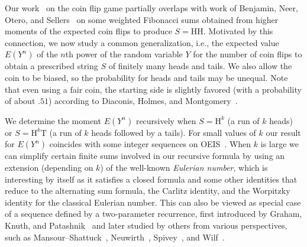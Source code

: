 \documentclass[10pt]{amsart}
\theoremstyle{definition}
\theoremstyle{remark}
\newcommand{\HH}{\mathrm{H}} \newcommand{\TT}{\mathrm{T}}
\begin{document}
Our work~\cite{Huang} on the coin flip game partially overlaps with work of Benjamin, Neer, Otero, and Sellers~\cite{ProbFibSum} on some weighted Fibonacci sums obtained from higher moments of the expected coin flips to produce $S=\HH\HH$.
Motivated by this connection, we now study a common generalization, i.e., the expected value $E(Y^n)$ of the $n$th power of the random variable $Y$ for the number of coin flips to obtain a prescribed string $S$ of finitely many heads and tails.
We also allow the coin to be biased, so the probability for heads and tails may be unequal.
Note that even using a fair coin, the starting side is slightly favored (with a probability of about $.51$) according to Diaconis, Holmes, and Montgomery~\cite{bias}.

We determine the moment $E(Y^n)$ recursively when $S=\HH^k$ (a run of $k$ heads) or $S=\HH^k\TT$ (a run of $k$ heads followed by a tails).
For small values of $k$ our result for $E(Y^n)$ coincides with some integer sequences on OEIS~\cite{OEIS}.
When $k$ is large we can simplify certain finite sums involved in our recursive formula by using an extension (depending on $k$) of the well-known \emph{Eulerian number}, which is interesting by itself as it satisfies a closed formula and some other identities that reduce to the alternating sum formula, the Carlitz identity, and the Worpitzky identity for the classical Eulerian number.
This can also be viewed as special case of a sequence defined by a two-parameter recurrence, first introduced by Graham, Knuth, and Patashnik~\cite{GKP} and later studied by others from various perspectives, such as Mansour--Shattuck~\cite{MansourShattuck}, Neuwirth~\cite{Neuwirth}, Spivey~\cite{Spivey}, and Wilf~\cite{Wilf}.
\end{document}
